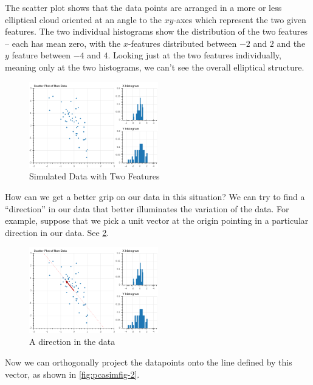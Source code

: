 \documentclass[
]{article}
\begin{document}
The scatter plot shows that the data points are arranged in a more or
less elliptical cloud oriented at an angle to the \(xy\)-axes which
represent the two given features. The two individual histograms show the
distribution of the two features -- each has mean zero, with the
\(x\)-features distributed between \(-2\) and \(2\) and the \(y\)
feature between \(-4\) and \(4\). Looking just at the two features
individually, meaning only at the two histograms, we can't see the
overall elliptical structure.

\begin{figure}
\hypertarget{fig:pcasimfig}{%
\centering
\includegraphics[width=0.5\textwidth,height=\textheight]{../img/PCAsimulated-1.png}
\caption{Simulated Data with Two Features}\label{fig:pcasimfig}
}
\end{figure}

How can we get a better grip on our data in this situation? We can try
to find a ``direction'' in our data that better illuminates the
variation of the data. For example, suppose that we pick a unit vector
at the origin pointing in a particular direction in our data. See
\cref{fig:pcasimfig-1}.

\begin{figure}
\hypertarget{fig:pcasimfig-1}{%
\centering
\includegraphics[width=0.5\textwidth,height=\textheight]{../img/PCAsimulated-2.png}
\caption{A direction in the data}\label{fig:pcasimfig-1}
}
\end{figure}

Now we can orthogonally project the datapoints onto the line defined by
this vector, as shown in \cref{fig:pcasimfig-2}.
\end{document}
